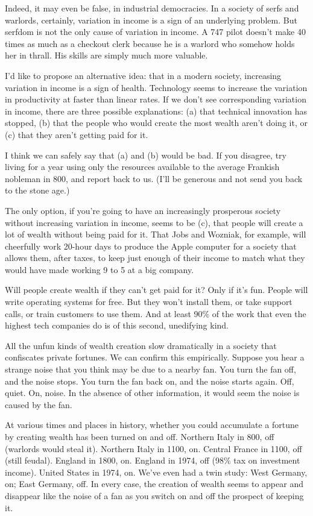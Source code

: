 \documentclass[12pt]{book}
\begin{document}
Indeed, it may even be false, in industrial democracies. In a society of
serfs and warlords, certainly, variation in income is a sign of an
underlying problem. But serfdom is not the only cause of variation in
income. A 747 pilot doesn't make 40 times as much as a checkout clerk
because he is a warlord who somehow holds her in thrall. His skills are
simply much more valuable.

I'd like to propose an alternative idea: that in a modern society,
increasing variation in income is a sign of health. Technology seems to
increase the variation in productivity at faster than linear rates. If
we don't see corresponding variation in income, there are three possible
explanations: (a) that technical innovation has stopped, (b) that the
people who would create the most wealth aren't doing it, or (c) that
they aren't getting paid for it.

I think we can safely say that (a) and (b) would be bad. If you
disagree, try living for a year using only the resources available to
the average Frankish nobleman in 800, and report back to us. (I'll be
generous and not send you back to the stone age.)

The only option, if you're going to have an increasingly prosperous
society without increasing variation in income, seems to be (c), that
people will create a lot of wealth without being paid for it. That Jobs
and Wozniak, for example, will cheerfully work 20-hour days to produce
the Apple computer for a society that allows them, after taxes, to keep
just enough of their income to match what they would have made working 9
to 5 at a big company.

Will people create wealth if they can't get paid for it? Only if it's
fun. People will write operating systems for free. But they won't
install them, or take support calls, or train customers to use them. And
at least 90\% of the work that even the highest tech companies do is of
this second, unedifying kind.

All the unfun kinds of wealth creation slow dramatically in a society
that confiscates private fortunes. We can confirm this empirically.
Suppose you hear a strange noise that you think may be due to a nearby
fan. You turn the fan off, and the noise stops. You turn the fan back
on, and the noise starts again. Off, quiet. On, noise. In the absence of
other information, it would seem the noise is caused by the fan.

At various times and places in history, whether you could accumulate a
fortune by creating wealth has been turned on and off. Northern Italy in
800, off (warlords would steal it). Northern Italy in 1100, on. Central
France in 1100, off (still feudal). England in 1800, on. England in
1974, off (98\% tax on investment income). United States in 1974, on.
We've even had a twin study: West Germany, on; East Germany, off. In
every case, the creation of wealth seems to appear and disappear like
the noise of a fan as you switch on and off the prospect of keeping it.
\end{document}

